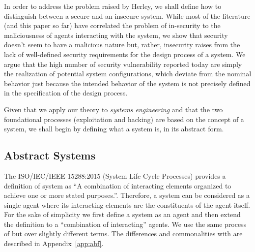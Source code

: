 In order to address the problem raised by Herley, 
we shall define how to distinguish between a secure and an insecure system.
While most of the literature (and this paper so far) have
correlated the problem of in-security to the maliciousness of
agents interacting with the system, we show that security
doesn't seem to have a malicious nature but, rather, insecurity 
raises from the lack of well-defined security requirements for the
design process of a system. We argue that the high number
of security vulnerability reported today are simply the realization
of potential system configurations, which deviate from the nominal
behavior just because the intended behavior of the system is not precisely 
defined in the specification of the design process. 

Given that we apply our theory to \emph{systems engineering} and that
the two foundational processes (exploitation and hacking) are based on the
concept of a system, we shall begin by defining what a system is, in its
abstract form.

\subsection{Abstract Systems}\label{sec:system}
The ISO/IEC/IEEE 15288:2015 (System Life Cycle Processes) provides a definition
of system as ``A combination of interacting elements organized to achieve one
or more stated purposes.''\autocite{ISO201515288}.  Therefore, a system can be
considered as a single agent where its interacting elements are the
constituents of the agent itself. For the sake of simplicity we first define a
system as an agent and then extend the definition to a ``combination of
interacting'' agents.  We use the same process of \autocite{Santaca2016abf} but
over slightly different terms. The differences and commonalities with
\autocite{Santaca2016abf} are described in Appendix~\ref{app:abf}. 

